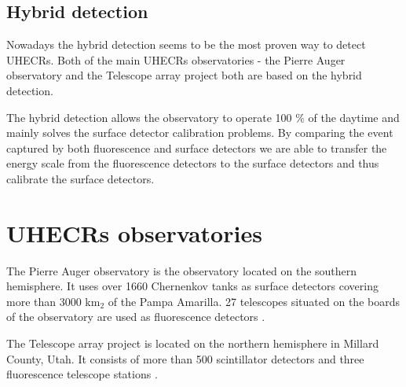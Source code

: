 \subsection{Hybrid detection}
Nowadays the hybrid detection seems to be the most proven way to detect UHECRs. Both of the main UHECRs observatories - the Pierre Auger observatory and the Telescope array project both are based on the hybrid detection. 
\par
The hybrid detection allows the observatory to operate 100 $\%$ of the daytime and mainly solves the surface detector calibration problems. By comparing the event captured by both fluorescence and surface detectors we are able to transfer the energy scale from the fluorescence detectors to the surface detectors and thus calibrate the surface detectors.



\section{UHECRs observatories}
The Pierre Auger observatory is the observatory located on the southern hemisphere. It uses over 1660 Chernenkov tanks as surface detectors covering more than 3000 k$\textrm{m}_2$ of the Pampa Amarilla. 27 telescopes situated on the boards of the observatory are used as fluorescence detectors \cite{Tomankova2016_1000061954}.
\par
The Telescope array project is located on the northern hemisphere in Millard County, Utah. It consists of more than 500 scintillator detectors and  three fluorescence telescope stations \cite{Array}.


